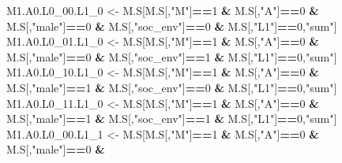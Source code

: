 \documentclass[
]{book}
\newenvironment{Shaded}{\begin{snugshade}}{\end{snugshade}}
\newcommand{\DecValTok}[1]{\textcolor[rgb]{0.00,0.00,0.81}{#1}}
\newcommand{\NormalTok}[1]{#1}
\newcommand{\OtherTok}[1]{\textcolor[rgb]{0.56,0.35,0.01}{#1}}
\newcommand{\SpecialCharTok}[1]{\textcolor[rgb]{0.81,0.36,0.00}{\textbf{#1}}}
\newcommand{\StringTok}[1]{\textcolor[rgb]{0.31,0.60,0.02}{#1}}
\begin{document}
\begin{Shaded}
\begin{Highlighting}[]
\NormalTok{  M1.A0.L0\_00.L1\_0 }\OtherTok{\textless{}{-}}\NormalTok{ M.S[M.S[,}\StringTok{"M"}\NormalTok{]}\SpecialCharTok{==}\DecValTok{1} \SpecialCharTok{\&}\NormalTok{ M.S[,}\StringTok{"A"}\NormalTok{]}\SpecialCharTok{==}\DecValTok{0} \SpecialCharTok{\&}\NormalTok{ M.S[,}\StringTok{"male"}\NormalTok{]}\SpecialCharTok{==}\DecValTok{0} \SpecialCharTok{\&} 
\NormalTok{                            M.S[,}\StringTok{"soc\_env"}\NormalTok{]}\SpecialCharTok{==}\DecValTok{0} \SpecialCharTok{\&}\NormalTok{ M.S[,}\StringTok{"L1"}\NormalTok{]}\SpecialCharTok{==}\DecValTok{0}\NormalTok{,}\StringTok{"sum"}\NormalTok{]}
\NormalTok{  M1.A0.L0\_01.L1\_0 }\OtherTok{\textless{}{-}}\NormalTok{ M.S[M.S[,}\StringTok{"M"}\NormalTok{]}\SpecialCharTok{==}\DecValTok{1} \SpecialCharTok{\&}\NormalTok{ M.S[,}\StringTok{"A"}\NormalTok{]}\SpecialCharTok{==}\DecValTok{0} \SpecialCharTok{\&}\NormalTok{ M.S[,}\StringTok{"male"}\NormalTok{]}\SpecialCharTok{==}\DecValTok{0} \SpecialCharTok{\&} 
\NormalTok{                            M.S[,}\StringTok{"soc\_env"}\NormalTok{]}\SpecialCharTok{==}\DecValTok{1} \SpecialCharTok{\&}\NormalTok{ M.S[,}\StringTok{"L1"}\NormalTok{]}\SpecialCharTok{==}\DecValTok{0}\NormalTok{,}\StringTok{"sum"}\NormalTok{]}
\NormalTok{  M1.A0.L0\_10.L1\_0 }\OtherTok{\textless{}{-}}\NormalTok{ M.S[M.S[,}\StringTok{"M"}\NormalTok{]}\SpecialCharTok{==}\DecValTok{1} \SpecialCharTok{\&}\NormalTok{ M.S[,}\StringTok{"A"}\NormalTok{]}\SpecialCharTok{==}\DecValTok{0} \SpecialCharTok{\&}\NormalTok{ M.S[,}\StringTok{"male"}\NormalTok{]}\SpecialCharTok{==}\DecValTok{1} \SpecialCharTok{\&} 
\NormalTok{                            M.S[,}\StringTok{"soc\_env"}\NormalTok{]}\SpecialCharTok{==}\DecValTok{0} \SpecialCharTok{\&}\NormalTok{ M.S[,}\StringTok{"L1"}\NormalTok{]}\SpecialCharTok{==}\DecValTok{0}\NormalTok{,}\StringTok{"sum"}\NormalTok{]}
\NormalTok{  M1.A0.L0\_11.L1\_0 }\OtherTok{\textless{}{-}}\NormalTok{ M.S[M.S[,}\StringTok{"M"}\NormalTok{]}\SpecialCharTok{==}\DecValTok{1} \SpecialCharTok{\&}\NormalTok{ M.S[,}\StringTok{"A"}\NormalTok{]}\SpecialCharTok{==}\DecValTok{0} \SpecialCharTok{\&}\NormalTok{ M.S[,}\StringTok{"male"}\NormalTok{]}\SpecialCharTok{==}\DecValTok{1} \SpecialCharTok{\&} 
\NormalTok{                            M.S[,}\StringTok{"soc\_env"}\NormalTok{]}\SpecialCharTok{==}\DecValTok{1} \SpecialCharTok{\&}\NormalTok{ M.S[,}\StringTok{"L1"}\NormalTok{]}\SpecialCharTok{==}\DecValTok{0}\NormalTok{,}\StringTok{"sum"}\NormalTok{]}
\NormalTok{  M1.A0.L0\_00.L1\_1 }\OtherTok{\textless{}{-}}\NormalTok{ M.S[M.S[,}\StringTok{"M"}\NormalTok{]}\SpecialCharTok{==}\DecValTok{1} \SpecialCharTok{\&}\NormalTok{ M.S[,}\StringTok{"A"}\NormalTok{]}\SpecialCharTok{==}\DecValTok{0} \SpecialCharTok{\&}\NormalTok{ M.S[,}\StringTok{"male"}\NormalTok{]}\SpecialCharTok{==}\DecValTok{0} \SpecialCharTok{\&} 

\end{Highlighting}
\end{Shaded}
\end{document}
